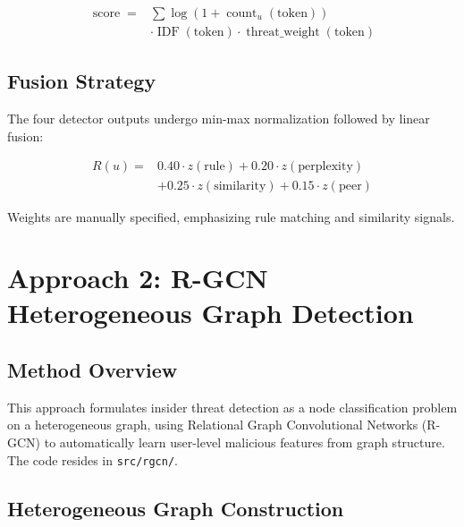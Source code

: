 \documentclass[
  a4paper,
  11pt]{article}
\begin{document}
\begin{equation}
\begin{aligned}
\operatorname{score} =
&\sum \log\left(1 + \operatorname{count}_u(\mathrm{token})\right) \\
&\cdot \operatorname{IDF}(\mathrm{token})
 \cdot \operatorname{threat\_weight}(\mathrm{token})
\end{aligned}
\end{equation}

\subsection{Fusion Strategy}\label{fusion-strategy}

The four detector outputs undergo min-max normalization followed by
linear fusion:

\begin{equation}
\begin{aligned}
R(u) =
&0.40 \cdot z(\mathrm{rule})
+ 0.20 \cdot z(\mathrm{perplexity}) \\
&+ 0.25 \cdot z(\mathrm{similarity})
+ 0.15 \cdot z(\mathrm{peer})
\end{aligned}
\end{equation}

Weights are manually specified, emphasizing rule matching and similarity
signals.

\section{Approach 2: R-GCN Heterogeneous Graph
Detection}\label{approach-2-r-gcn-heterogeneous-graph-detection}

\subsection{Method Overview}\label{method-overview-1}

This approach formulates insider threat detection as a node
classification problem on a heterogeneous graph, using Relational Graph
Convolutional Networks (R-GCN) to automatically learn user-level
malicious features from graph structure. The code resides in
\texttt{src/rgcn/}.

\subsection{Heterogeneous Graph
Construction}\label{heterogeneous-graph-construction}
\end{document}
